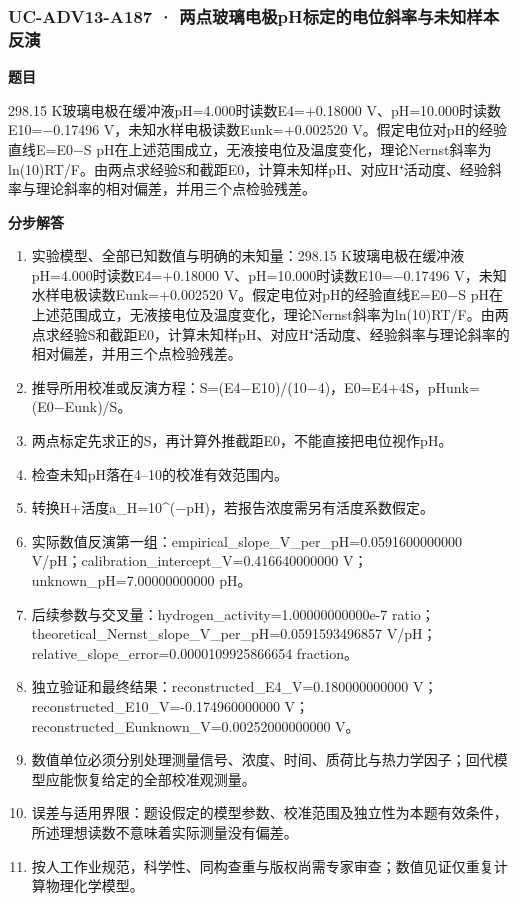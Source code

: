 \documentclass[UTF8,11pt,a4paper]{ctexart}
\begin{document}
\subsubsection*{UC-ADV13-A187 · 两点玻璃电极pH标定的电位斜率与未知样本反演}
\noindent\textbf{题目}\par
298.15 K玻璃电极在缓冲液pH=4.000时读数E4=+0.18000 V、pH=10.000时读数E10=−0.17496 V，未知水样电极读数Eunk=+0.002520 V。假定电位对pH的经验直线E=E0−S pH在上述范围成立，无液接电位及温度变化，理论Nernst斜率为ln(10)RT/F。由两点求经验S和截距E0，计算未知样pH、对应H⁺活动度、经验斜率与理论斜率的相对偏差，并用三个点检验残差。\par
\medskip\noindent\textbf{分步解答}
\begin{enumerate}
\item 实验模型、全部已知数值与明确的未知量：298.15 K玻璃电极在缓冲液pH=4.000时读数E4=+0.18000 V、pH=10.000时读数E10=−0.17496 V，未知水样电极读数Eunk=+0.002520 V。假定电位对pH的经验直线E=E0−S pH在上述范围成立，无液接电位及温度变化，理论Nernst斜率为ln(10)RT/F。由两点求经验S和截距E0，计算未知样pH、对应H⁺活动度、经验斜率与理论斜率的相对偏差，并用三个点检验残差。
\item 推导所用校准或反演方程：S=(E4−E10)/(10−4)，E0=E4+4S，pHunk=(E0−Eunk)/S。
\item 两点标定先求正的S，再计算外推截距E0，不能直接把电位视作pH。
\item 检查未知pH落在4–10的校准有效范围内。
\item 转换H+活度a\_H=10\textasciicircum{}(−pH)，若报告浓度需另有活度系数假定。
\item 实际数值反演第一组：empirical\_slope\_V\_per\_pH=0.0591600000000 V/pH；calibration\_intercept\_V=0.416640000000 V；unknown\_pH=7.00000000000 pH。
\item 后续参数与交叉量：hydrogen\_activity=1.00000000000e-7 ratio；theoretical\_Nernst\_slope\_V\_per\_pH=0.0591593496857 V/pH；relative\_slope\_error=0.0000109925866654 fraction。
\item 独立验证和最终结果：reconstructed\_E4\_V=0.180000000000 V；reconstructed\_E10\_V=-0.174960000000 V；reconstructed\_Eunknown\_V=0.00252000000000 V。
\item 数值单位必须分别处理测量信号、浓度、时间、质荷比与热力学因子；回代模型应能恢复给定的全部校准观测量。
\item 误差与适用界限：题设假定的模型参数、校准范围及独立性为本题有效条件，所述理想读数不意味着实际测量没有偏差。
\item 按人工作业规范，科学性、同构查重与版权尚需专家审查；数值见证仅重复计算物理化学模型。
\end{enumerate}
\end{document}
